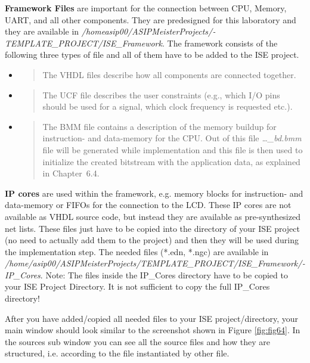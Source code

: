 \textbf{Framework Files} are important for the connection between CPU,
Memory, UART, and all other components. They are predesigned for this
laboratory and they are available in
\emph{/homeasip00/­ASIPMeisterProjects/­TEMPLATE\_PROJECT/­ISE\_Framework}.
The framework consists of the following three types of file and all of
them have to be added to the ISE project.

\begin{itemize}
\item
  \begin{quote}
  The VHDL files describe how all components are connected together.
  \end{quote}
\item
  \begin{quote}
  The UCF file describes the user constraints (e.g., which I/O pins
  should be used for a signal, which clock frequency is requested etc.).
  \end{quote}
\item
  \begin{quote}
  The BMM file contains a description of the memory buildup for
  instruction- and data-memory for the CPU. Out of this file
  \emph{\ldots\_bd.bmm} file will be generated while implementation and
  this file is then used to initialize the created bitstream with the
  application data, as explained in Chapter~6.4.
  \end{quote}
\end{itemize}

\textbf{IP cores} are used within the framework, e.g. memory blocks for
instruction- and data-memory or FIFOs for the connection to the LCD.
These IP cores are not available as VHDL source code, but instead they
are available as pre-synthesized net lists. These files just have to be
copied into the directory of your ISE project (no need to actually add
them to the project) and then they will be used during the
implementation step. The needed files (*.edn, *.ngc) are available in
\emph{/home/asip00/­ASIPMeisterProjects/­TEMPLATE\_PROJECT/­ISE\_Framework/­IP\_­Cores}.
Note: The files {inside} the IP\_Cores directory have to be copied to
your ISE Project Directory. It is not sufficient to copy the full
IP\_Cores directory!

After you have added/copied all needed files to your ISE
project/directory, your main window should look similar to the
screenshot shown in Figure \ref{fig:fig64}. In the
sources sub window you can see all the source files and how they are
structured, i.e. according to the file instantiated by other file.

